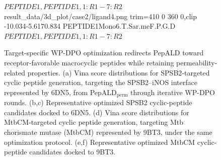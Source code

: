 \begin{figure}[!t]
{$PEPTIDE1,PEPTIDE1,1:R1-7:R2$$$}\hfill
{}
{result_data/3d_plot/case2/ligand4.png}
{trim=410 0 360 0,clip}
{-10.034}{-5.617}{0.834}
{PEPTIDE1{Mono6.T.Sar.meF.P.G.D}}
{$PEPTIDE1,PEPTIDE1,1:R1-7:R2$$$}
\caption{Target-specific WP-DPO optimization redirects PepALD toward receptor-favorable macrocyclic peptides while retaining permeability-related properties.
(a) Vina score distributions for SPSB2-targeted cyclic peptide generation, targeting the SPSB2--iNOS interface represented by 6DN5, from PepALD$_{\mathrm{perm}}$ through iterative WP-DPO rounds.
(b,c) Representative optimized SPSB2 cyclic-peptide candidates docked to 6DN5.
(d) Vina score distributions for MtbCM-targeted cyclic peptide generation, targeting Mtb chorismate mutase (MtbCM) represented by 9BT3, under the same optimization protocol.
(e,f) Representative optimized MtbCM cyclic-peptide candidates docked to 9BT3.}
\label{fig:specific_task_optimization}
\endgroup
\end{figure}
